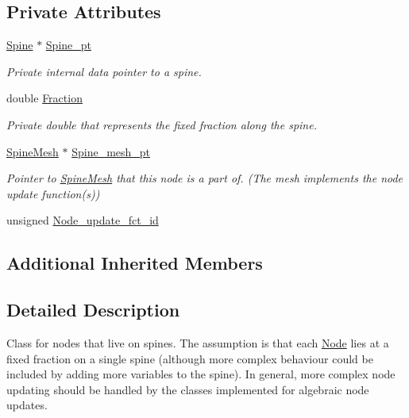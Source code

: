 \subsection*{Private Attributes}
\begin{DoxyCompactItemize}
\item 
\hyperlink{classoomph_1_1Spine}{Spine} $\ast$ \hyperlink{classoomph_1_1SpineNode_aa37f2daad3dddb01e58ecec5d9304cd0}{Spine\+\_\+pt}
\begin{DoxyCompactList}\small\item\em Private internal data pointer to a spine. \end{DoxyCompactList}\item 
double \hyperlink{classoomph_1_1SpineNode_a87d72975d31d015c4360b5092abdbf69}{Fraction}
\begin{DoxyCompactList}\small\item\em Private double that represents the fixed fraction along the spine. \end{DoxyCompactList}\item 
\hyperlink{classoomph_1_1SpineMesh}{Spine\+Mesh} $\ast$ \hyperlink{classoomph_1_1SpineNode_a8154a0fe0c361b730edc27e8e85c077a}{Spine\+\_\+mesh\+\_\+pt}
\begin{DoxyCompactList}\small\item\em Pointer to \hyperlink{classoomph_1_1SpineMesh}{Spine\+Mesh} that this node is a part of. (The mesh implements the node update function(s)) \end{DoxyCompactList}\item 
unsigned \hyperlink{classoomph_1_1SpineNode_ac68d55d54018e5d908c5f81ab4b053a7}{Node\+\_\+update\+\_\+fct\+\_\+id}
\end{DoxyCompactItemize}
\subsection*{Additional Inherited Members}


\subsection{Detailed Description}
Class for nodes that live on spines. The assumption is that each \hyperlink{classoomph_1_1Node}{Node} lies at a fixed fraction on a single spine (although more complex behaviour could be included by adding more variables to the spine). In general, more complex node updating should be handled by the classes implemented for algebraic node updates. 

